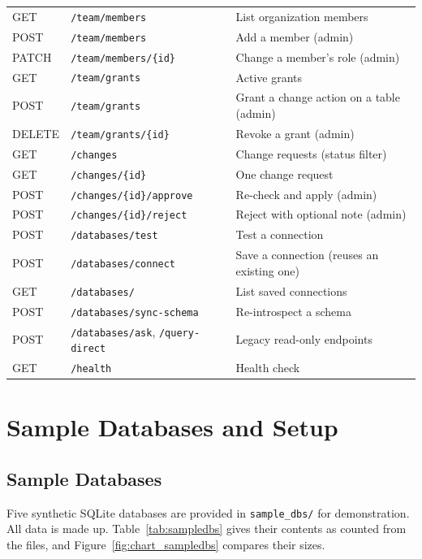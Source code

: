 \begin{longtable}{p{1.2cm} p{7.4cm} p{6.4cm}}
    GET    & \texttt{/team/members} & List organization members \\
    POST   & \texttt{/team/members} & Add a member (admin) \\
    PATCH  & \texttt{/team/members/\{id\}} & Change a member's role (admin) \\
    GET    & \texttt{/team/grants} & Active grants \\
    POST   & \texttt{/team/grants} & Grant a change action on a table (admin) \\
    DELETE & \texttt{/team/grants/\{id\}} & Revoke a grant (admin) \\
    GET    & \texttt{/changes} & Change requests (status filter) \\
    GET    & \texttt{/changes/\{id\}} & One change request \\
    POST   & \texttt{/changes/\{id\}/approve} & Re-check and apply (admin) \\
    POST   & \texttt{/changes/\{id\}/reject} & Reject with optional note (admin) \\
    POST   & \texttt{/databases/test} & Test a connection \\
    POST   & \texttt{/databases/connect} & Save a connection (reuses an existing one) \\
    GET    & \texttt{/databases/} & List saved connections \\
    POST   & \texttt{/databases/sync-schema} & Re-introspect a schema \\
    POST   & \texttt{/databases/ask}, \texttt{/query-direct} & Legacy read-only endpoints \\
    GET    & \texttt{/health} & Health check \\
    \bottomrule
\end{longtable}
\endgroup

\chapter{Sample Databases and Setup}
\label{app:sampledbs}

\section{Sample Databases}
Five synthetic SQLite databases are provided in \texttt{sample\_dbs/} for demonstration. All
data is made up. Table~\ref{tab:sampledbs} gives their contents as counted from the files,
and Figure~\ref{fig:chart_sampledbs} compares their sizes.

